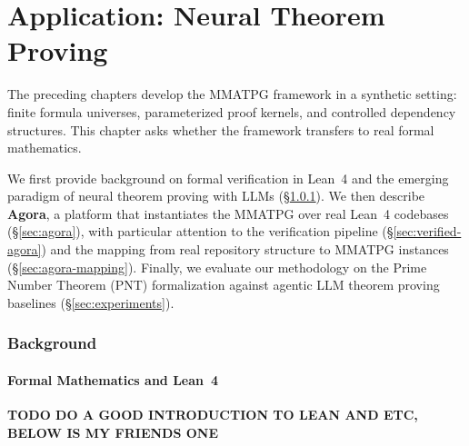 \chapter{Application: Neural Theorem Proving}\label{chap:application}

The preceding chapters develop the MMATPG framework in a synthetic setting: finite formula universes, parameterized proof kernels, and controlled dependency structures. This chapter asks whether the framework transfers to real formal mathematics.

We first provide background on formal verification in Lean~4 and the emerging paradigm of neural theorem proving with LLMs (\S\ref{sec:lean-background}). We then describe \textbf{Agora}, a platform that instantiates the MMATPG over real Lean~4 codebases (\S\ref{sec:agora}), with particular attention to the verification pipeline (\S\ref{sec:verified-agora}) and the mapping from real repository structure to MMATPG instances (\S\ref{sec:agora-mapping}). Finally, we evaluate our methodology on the Prime Number Theorem (PNT) formalization against agentic LLM theorem proving baselines (\S\ref{sec:experiments}).


\subsection{Background}\label{sec:lean-background}

\subsubsection{Formal Mathematics and Lean~4}

\textbf{TODO DO A GOOD INTRODUCTION TO LEAN AND ETC, BELOW IS MY FRIENDS ONE}

